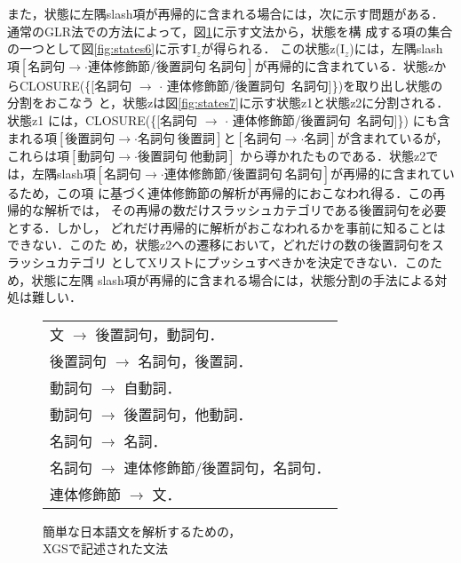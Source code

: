 \vspace{-3mm}
また，状態に左隅slash項が再帰的に含まれる場合には，次に示す問題がある．
通常のGLR法での方法によって，図\ref{fig:xgs3}に示す文法から，状態を構
成する項の集合の一つとして図\ref{fig:states6}に示すI$_{z}$が得られる．
この状態z(I$_{z}$)には，左隅slash項$[名詞句 \to \cdot 連体修飾節/後置
詞句\ 名詞句]$が再帰的に含まれている．状態zからCLOSURE(\{[名詞句 $\to$
$\cdot$ 連体修飾節/後置詞句\ 名詞句]\})を取り出し状態の分割をおこなう
と，状態zは図\ref{fig:states7}に示す状態z1と状態z2に分割される．状態z1
には，CLOSURE(\{[名詞句 $\to$ $\cdot$ 連体修飾節/後置詞句\ 名詞句]\})
にも含まれる項$[後置詞句 \to \cdot 名詞句\ 後置詞]$と$[名詞句 \to
\cdot 名詞]$が含まれているが，これらは項$[動詞句 \to \cdot 後置詞句\ 
他動詞]$ から導かれたものである．状態z2では，左隅slash項$[名詞句 \to
\cdot 連体修飾節/後置詞句\ 名詞句]$が再帰的に含まれているため，この項
に基づく連体修飾節の解析が再帰的におこなわれ得る．この再帰的な解析では，
その再帰の数だけスラッシュカテゴリである後置詞句を必要とする．しかし，
どれだけ再帰的に解析がおこなわれるかを事前に知ることはできない．このた
め，状態z2への遷移において，どれだけの数の後置詞句をスラッシュカテゴリ
としてXリストにプッシュすべきかを決定できない．このため，状態に左隅
slash項が再帰的に含まれる場合には，状態分割の手法による対処は難しい．

\begin{figure}[htbp]
  \begin{center}
    \begin{tabular}[h]{l}
      文 $\to$ 後置詞句，動詞句．\\
      後置詞句 $\to$ 名詞句，後置詞．\\
      動詞句 $\to$ 自動詞．\\
      動詞句 $\to$ 後置詞句，他動詞．\\
      名詞句 $\to$ 名詞．\\
      名詞句 $\to$ 連体修飾節/後置詞句，名詞句．\\
      連体修飾節 $\to$ 文．
    \end{tabular}
    \caption{簡単な日本語文を解析するための，\\XGSで記述された文法}
    \label{fig:xgs3}
  \end{center}
\end{figure}

